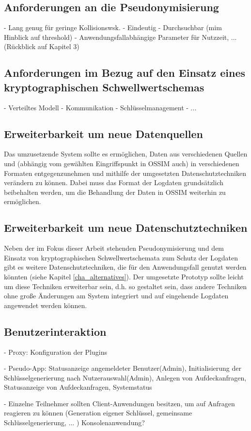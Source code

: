 \subsection*{Anforderungen an die Pseudonymisierung}

- Lang genug für geringe Kollisionswsk.
- Eindeutig
- Durchsuchbar (mim Hinblick auf threshold)
- Anwendungsfallabhängige Parameter für Nutzzeit, ... (Rückblick auf Kapitel 3)

\subsection*{Anforderungen im Bezug auf den Einsatz eines kryptographischen Schwellwertschemas}

- Verteiltes Modell 
- Kommunikation
- Schlüsselmanagement
- ...



\subsection*{Erweiterbarkeit um neue Datenquellen}

Das umzusetzende System sollte es ermöglichen, Daten aus verschiedenen Quellen und (abhängig vom gewählten Eingriffspunkt in OSSIM auch) in verschiedenen Formaten entgegenzunehmen und mithilfe der umgesetzten Datenschutztechniken verändern zu können. Dabei muss das Format der Logdaten grundsätzlich beibehalten werden, um die Behandlung der Daten in OSSIM weiterhin zu ermöglichen.

\subsection*{Erweiterbarkeit um neue Datenschutztechniken}

Neben der im Fokus dieser Arbeit stehenden Pseudonymisierung und dem Einsatz von kryptographischen Schwellwertschemata zum Schutz der Logdaten gibt es weitere Datenschutztechniken, die für den Anwendungsfall genutzt werden könnten (siehe Kapitel \ref{cha_alternatives}). Der umgesetzte Prototyp sollte leicht um diese Techniken erweiterbar sein, d.h. so gestaltet sein, dass andere Techniken ohne große Änderungen am System integriert und auf eingehende Logdaten angewendet werden können.

\subsection*{Benutzerinteraktion}

- Proxy: Konfiguration der Plugins

- Pseudo-App: Statusanzeige angemeldeter Benutzer(Admin), Initialisierung der Schlüsselgenerierung nach Nutzerauswahl(Admin), Anlegen von Aufdeckanfragen, Statusanzeige von Aufdeckanfragen, Systemstatus

- Einzelne Teilnehmer sollten Client-Anwendungen besitzen, um auf Anfragen reagieren zu können (Generation eigener Schlüssel, gemeinsame Schlüsselgenerierung, ... ) Konsolenanwendung? 